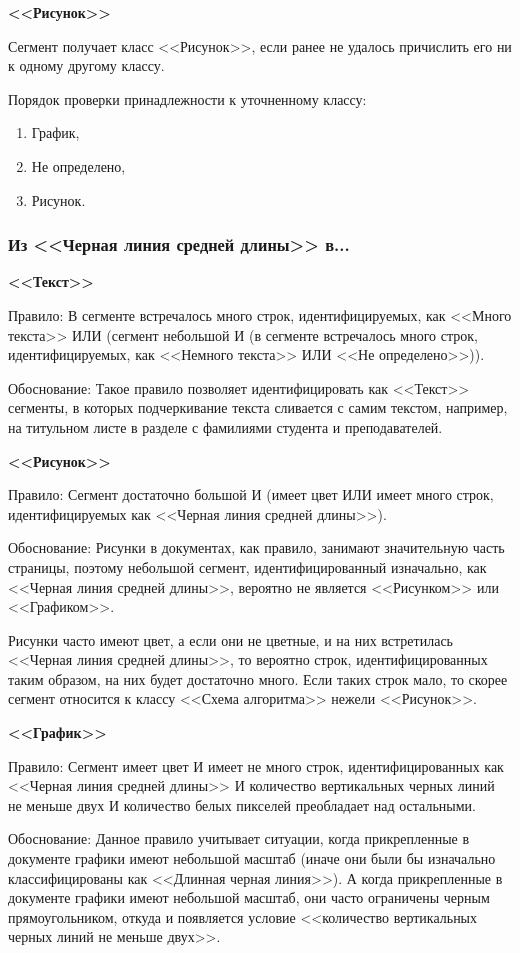 \textbf{<<Рисунок>>}

Сегмент получает класс <<Рисунок>>, если ранее не удалось причислить его ни к одному другому классу.

Порядок проверки принадлежности к уточненному классу:
\begin{enumerate}
    \item График,
    \item Не определено,
    \item Рисунок.
\end{enumerate}

\subsubsection*{Из <<Черная линия средней длины>> в...}

\textbf{<<Текст>>}

Правило: В сегменте встречалось много строк, идентифицируемых, как <<Много текста>> ИЛИ (сегмент небольшой И (в сегменте встречалось много строк, идентифицируемых, как <<Немного текста>> ИЛИ <<Не определено>>)).

Обоснование: Такое правило позволяет идентифицировать как <<Текст>> сегменты, в которых подчеркивание текста сливается с самим текстом, например, на титульном листе в разделе с фамилиями студента и преподавателей.

\textbf{<<Рисунок>>}

Правило: Сегмент достаточно большой И (имеет цвет ИЛИ имеет много строк, идентифицируемых как <<Черная линия средней длины>>).

Обоснование: Рисунки в документах, как правило, занимают значительную часть страницы, поэтому небольшой сегмент, идентифицированный изначально, как <<Черная линия средней длины>>, вероятно не является <<Рисунком>> или <<Графиком>>.

Рисунки часто имеют цвет, а если они не цветные, и на них встретилась <<Черная линия средней длины>>, то вероятно строк, идентифицированных таким образом, на них будет достаточно много.
Если таких строк мало, то скорее сегмент относится к классу <<Схема алгоритма>> нежели <<Рисунок>>.

\textbf{<<График>>}

Правило: Сегмент имеет цвет И имеет не много строк, идентифицированных как <<Черная линия средней длины>> И количество вертикальных черных линий не меньше двух И количество белых пикселей преобладает над остальными.

Обоснование: Данное правило учитывает ситуации, когда прикрепленные в документе графики имеют небольшой масштаб (иначе они были бы изначально классифицированы как <<Длинная черная линия>>).
А когда прикрепленные в документе графики имеют небольшой масштаб, они часто ограничены черным прямоугольником, откуда и появляется условие <<количество вертикальных черных линий не меньше двух>>.

